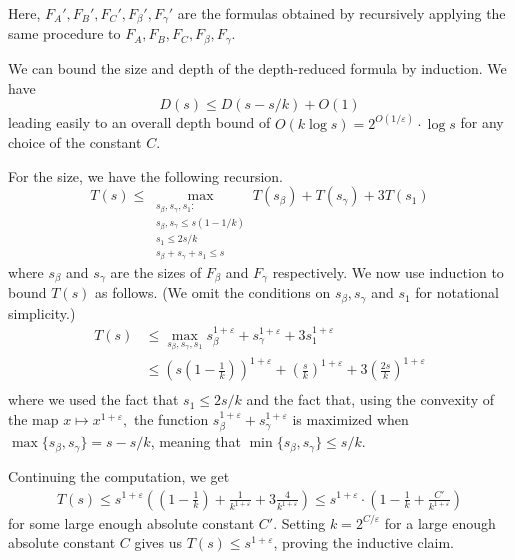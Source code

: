 \documentclass[11pt,a4paper]{article}
\begin{document}
Here, $F_A', F_B', F_C', F_\beta', F_\gamma'$ are the formulas obtained by recursively applying the same procedure to $F_A, F_B, F_C, F_\beta, F_\gamma$.

We can bound the size and depth of the depth-reduced formula by induction. We have
\[
D(s) \leq D(s-s/k) + O(1)
\]
leading easily to an overall depth bound of $O(k\log s)  = 2^{O(1/\varepsilon)}\cdot \log s$ for any choice of the constant $C$. 

For the size, we have the following recursion.
\[
T(s) \leq \max_{\substack{s_\beta,s_\gamma, s_1:\\ s_\beta, s_\gamma \leq s(1-1/k)\\ s_1 \leq 2s/k\\ s_\beta+s_\gamma+ s_1 \leq s}}T(s_\beta) + T(s_\gamma) + 3T(s_1)
\] 
where $s_\beta$ and $s_\gamma$ are the sizes of $F_\beta$ and $F_\gamma$ respectively. We now use induction to bound $T(s)$ as follows. (We omit the conditions on $s_\beta, s_\gamma$ and $s_1$ for notational simplicity.)
\begin{align*}
	T(s) &\leq \max_{s_\beta,s_\gamma, s_1} s_\beta^{1+\varepsilon} + s_\gamma^{1+\varepsilon} + 3 s_1^{1+\varepsilon}\\
	&\leq \left(s\left(1-\frac{1}{k}\right)\right)^{1+\varepsilon} + \left(\frac{s}{k}\right)^{1+\varepsilon} + 3 \left(\frac{2s}{k}\right)^{1+\varepsilon}\\
\end{align*}
where we used the fact that $s_1 \leq 2s/k$ and the fact that, using the convexity of the map $x\mapsto x^{1+\varepsilon},$ the function $s_\beta^{1+\varepsilon} + s_\gamma^{1+\varepsilon}$ is maximized when $\max\{s_\beta,s_\gamma\} = s-s/k$, meaning that $\min\{s_\beta,s_\gamma\}\leq s/k.$ 

Continuing the computation, we get
\begin{align*}
	T(s) \leq s^{1+\varepsilon} \left(\left(1-\frac{1}{k}\right) + \frac{1}{k^{1+\varepsilon}} + 3\frac{4}{k^{1+\varepsilon}}\right)\leq s^{1+\varepsilon}\cdot \left( 1-\frac{1}{k} + \frac{C'}{ k^{1+\varepsilon}}\right)
\end{align*}
for some large enough absolute constant $C'$. Setting $k = 2^{C/\varepsilon}$ for a large enough absolute constant $C$ gives us $T(s) \leq s^{1+\varepsilon}$, proving the inductive claim.
\end{document}
